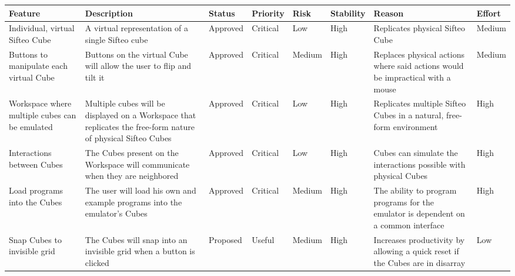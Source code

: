 \documentclass[12pt]{article}
\begin{document}
    \begin{landscape}
    \begin{table}[h]
      \begin{tabular}{p{1.5in} | p{1.75in} | p{.75in} | p{.75in} | p{.75in} | p{.75in} | p{1.75in} | p{.6in}}
        \textbf{Feature} &
        \textbf{Description} &
        \textbf{Status} &
        \textbf{Priority} &
        \textbf{Risk} &
        \textbf{Stability} &
        \textbf{Reason} &
        \textbf{Effort} \\ \hline

        Individual, virtual Sifteo Cube &
        A virtual representation of a single Sifteo cube &
        Approved &
        Critical &
        Low &
        High &
        Replicates physical Sifteo Cube &
        Medium \\ \hline

        Buttons to manipulate each virtual Cube &
        Buttons on the virtual Cube will allow the user to flip and tilt it &
        Approved &
        Critical &
        Medium &
        High &
        Replaces physical actions where said actions would be impractical with a mouse &
        Medium \\ \hline

        Workspace where multiple cubes can be emulated &
        Multiple cubes will be displayed on a Workspace that replicates the free-form nature of physical Sifteo Cubes &
        Approved &
        Critical &
        Low &
        High &
        Replicates multiple Sifteo Cubes in a natural, free-form environment &
        High \\ \hline

        Interactions between Cubes &
        The Cubes present on the Workspace will communicate when they are neighbored &
        Approved &
        Critical &
        Low &
        High &
        Cubes can simulate the interactions possible with physical Cubes &
        High \\ \hline

        Load programs into the Cubes &
        The user will load his own and example programs into the emulator’s Cubes &
        Approved &
        Critical &
        Medium &
        High &
        The ability to program programs for the emulator is dependent on a common interface &
        High \\ \hline

        Snap Cubes to invisible grid &
        The Cubes will snap into an invisible grid when a button is clicked &
        Proposed &
        Useful &
        Medium &
        High &
        Increases productivity by allowing a quick reset if the Cubes are in disarray &
        Low \\ \hline


\end{tabular}
\end{table}
\end{landscape}
\end{document}
